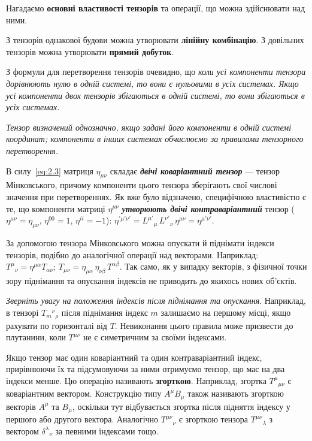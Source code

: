 Нагадаємо \textbf{основні властивості тензорів} та операції, що можна
здійснювати над ними.

З тензорів однакової будови можна утворювати \textbf{лінійну комбінацію}.
З довільних тензорів можна утворювати \textbf{прямий добуток}.

З формули для перетворення тензорів очевидно, що \textit{коли усі
компоненти тензора дорівнюють нулю в одній системі, то вони є нульовими
в усіх системах. Якщо усі компоненти двох тензорів збігаються в одній
системі, то вони збігаються в усіх системах.}

\textit{Тензор визначений однозначно, якщо задані його компоненти в одній
системі координат; компоненти в інших системах обчислюємо за правилами
тензорного перетворення.}

В силу~\eqref{eq:2.3} матриця $\eta_{\mu\nu}$ складає
\textit{\textbf{двічі коваріантний тензор}} --- тензор Мінковського,
причому компоненти цього тензора зберігають свої числові значення при
перетвореннях. Як вже було відзначено, специфічною властивістю є те, що
компоненти матриці $\eta^{\mu\nu}$ \textbf{\textit{утворюють двічі
контраваріантний}} тензор ($\eta^{\mu\nu} = \eta_{\mu\nu}$,
$\eta^{00}=1$, $\eta^{ii}=-1$):
$\eta^{\prime\mu'\nu'} = L^{\mu'}{}_\mu\, L^{\nu'}{}_\nu\, \eta^{\mu\nu} = \eta^{\mu'\nu'}$.

За допомогою тензора Мінковського можна опускати й піднімати індекси
тензорів, подібно до аналогічної операції над векторами. Наприклад:
$T^\mu{}_\nu = \eta^{\mu\alpha} T_{\alpha\nu}$;
$T_{\mu\nu} = \eta_{\mu\alpha}\, \eta_{\nu\beta}\, T^{\alpha\beta}$.
Так само, як у випадку векторів, з фізичної точки зору піднімання та
опускання індексів не приводить до якихось нових об'єктів.

\textit{Зверніть увагу на положення індексів після піднімання та
опускання}. Наприклад, в тензорі $T_m{}^\nu{}_\rho$
після піднімання індекс $m$ залишаємо на першому місці, якщо рахувати по
горизонталі від $T$. Невиконання цього правила може призвести до плутанини,
коли $T^{\mu\nu}$ не є симетричним за своїми індексами.

Якщо тензор має один коваріантний та один контраваріантний індекс,
прирівнюючи їх та підсумовуючи за ними отримуємо тензор, що має на два
індекси менше. Цю операцію називають \textbf{згорткою}. Наприклад, згортка
$T^\mu{}_{\mu\nu}$ є коваріантним вектором.
Конструкцію типу $A^\mu B_\mu$ також називають згорткою векторів $A^\mu$ та
$B_\mu$, оскільки тут відбувається згортка після підняття індексу у першого
або другого вектора. Аналогічно $T^{\mu\nu}{}_\nu$ є згорткою тензора
$T^{\mu\nu}{}_\lambda$ з вектором $\delta^\lambda{}_\nu$ за певними індексами тощо.

